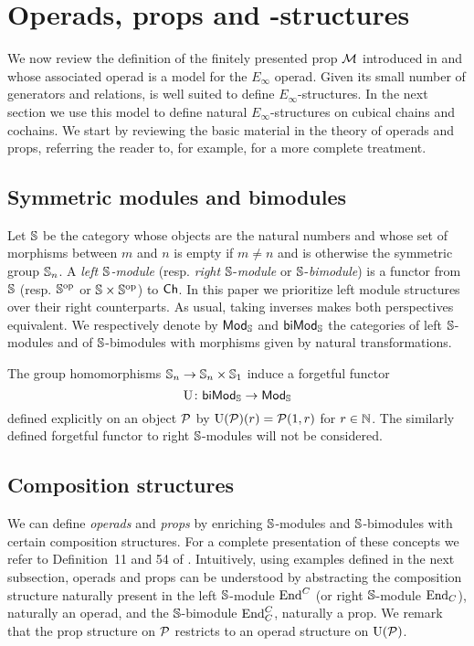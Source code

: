 
\section{Operads, props and \pdfEinfty-structures} \label{s:operads and props}

We now review the definition of the finitely presented prop $\M$ introduced in \cite{medina2020prop1} and whose associated operad is a model for the  $E_\infty$ operad.
Given its small number of generators and relations, is well suited to define $E_\infty$-structures.
In the next section we use this model to define natural $E_\infty$-structures on cubical chains and cochains.
We start by reviewing the basic material in the theory of operads and props, referring the reader to, for example, \cite{markl2008props} for a more complete treatment.

\subsection{Symmetric modules and bimodules}

Let $\S$ be the category whose objects are the natural numbers and whose set of morphisms between $m$ and $n$ is empty if $m \neq n$ and is otherwise the symmetric group $\S_n$.
A \textit{left $\S$-module} (resp. \textit{right} $\S$-\textit{module} or $\S$-\textit{bimodule}) is a functor from $\S$ (resp. $\S^\op$ or $\S \times \S^\op$) to $\Ch$.
In this paper we prioritize left module structures over their right counterparts.
As usual, taking inverses makes both perspectives equivalent.
We respectively denote by $\Smod$ and $\Sbimod$ the categories of left $\S$-modules and of $\S$-bimodules with morphisms given by natural transformations.

The group homomorphisms $\S_n \to \S_n \times \S_1$ induce a forgetful functor \[
\forget \colon \Sbimod \to \Smod
\]
defined explicitly on an object $\cP$ by $\forget(\cP)(r) = \cP(1, r)$ for $r \in \N$.
The similarly defined forgetful functor to right $\S$-modules will not be considered.

\subsection{Composition structures}

We can define \textit{operads} and \textit{props} by enriching $\S$-modules and $\S$-bimodules with certain composition structures.
For a complete presentation of these concepts we refer to Definition~11 and 54 of \cite{markl2008props}.
Intuitively, using examples defined in the next subsection, operads and props can be understood by abstracting the composition structure naturally present in the left $\S$-module $\End^C$ (or right $\S$-module $\End_C$), naturally an operad, and the $\S$-bimodule $\End^C_C$, naturally a prop.
We remark that the prop structure on $\cP$ restricts to an operad structure on $\forget(\cP)$.

